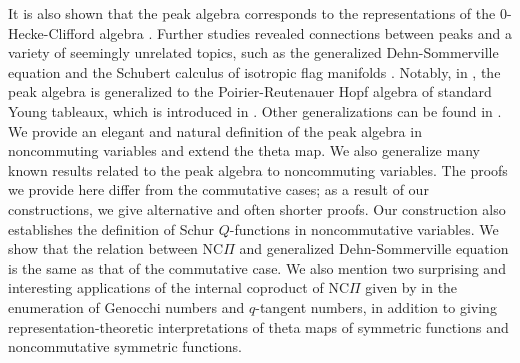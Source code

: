 \documentclass[11pt]{amsart}
\numberwithin{equation}{section}
\newcommand{\NCPeak}{\mathrm{NC}\Pi}
\begin{document}
  It is also shown that the peak algebra corresponds to the representations of the $0$-Hecke-Clifford algebra \cite{B04}. 
Further studies revealed connections between peaks and a variety of seemingly unrelated topics, such as the generalized Dehn-Sommerville equation \cite{A06, BMSvW0, B03} and the Schubert calculus of isotropic flag manifolds \cite{BMSvW0, BH}. Notably, in \cite{Nym01, N03}, the peak algebra is generalized to the Poirier-Reutenauer Hopf algebra of standard Young tableaux, which is introduced in \cite{P95}. Other generalizations can be found in \cite{A04, B06, H06}. \\

We provide an elegant and natural definition of the peak algebra in noncommuting variables and extend the theta map. We also generalize many known results related to the peak algebra to noncommuting variables. The proofs we provide here differ from the commutative cases; as a result of our constructions, we give alternative and often shorter proofs.  Our construction also establishes the definition of Schur $Q$-functions in noncommutative variables. We show that the relation between $\NCPeak$ and generalized Dehn-Sommerville equation is the same as that of the commutative case. 
 We also mention two surprising and interesting applications of the internal coproduct of $\NCPeak$ given by \cite{ZLZ} in the enumeration of Genocchi numbers and $q$-tangent numbers, in addition to giving representation-theoretic interpretations of theta maps of symmetric functions and noncommutative symmetric functions. \\
\end{document}
